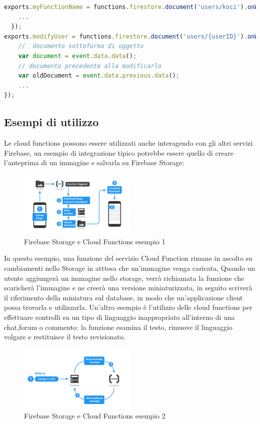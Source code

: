 \begin{lstlisting}[language=javascript,caption={Cloud functions esempio 1 }]
exports.myFunctionName = functions.firestore.document('users/koci').onWrite((event) => {
    ...
  });
exports.modifyUser = functions.firestore.document('users/{userID}').onWrite(event => {
    //  documento sottoforma di oggetto
    var document = event.data.data();
    // documento precedente alla modificarlo
    var oldDocument = event.data.previous.data();
    ...
});
\end{lstlisting}


\newpage              %
\subsection{Esempi di utilizzo}
Le cloud functions possono essere utilizzati anche interagendo con gli altri servizi Firebase, un esempio di integrazione tipico potrebbe essere quello di creare l'anteprima di un immagine e salvarla su Firebase Storage:

\begin{figure}[!h]
  \centering
  \includegraphics[width=0.5\textwidth]{immagini/functions_ex1.png}
  \caption{Firebase Storage e Cloud Functions esempio 1}\label{fig:Firebase Storage e Cloud Functions esempio 1}
\end{figure}

In questo esempio, una funzione del servizio Cloud Function rimane in ascolto su cambiamenti nello Storage in atttesa che un'immagine venga caricata, Quando un utente aggiungerà un immagine nello storage, verrà richiamata la funzione che scaricherà l'immagine e ne creerà una versione miniaturizzata, in seguito scriverà il riferimento della miniatura sul database, in modo che un'applicazione client possa trovarla e utilizzarla.
Un'altro esempio è l'utilizzo delle cloud functions per effettuare controlli su un tipo di linguaggio inappropriato all'interno di una chat,forum o commento:
la funzione esamina il testo, rimuove il linguaggio volgare e restituisce il testo revisionato.


\begin{figure}[!h]
\centering
  \includegraphics[width=0.5\textwidth]{immagini/functions_ex2.png}
  \caption{Firebase Storage e Cloud Functions esempio 2}
  \label{fig:Firebase Storage e Cloud Functions esempio 2}
\end{figure}


